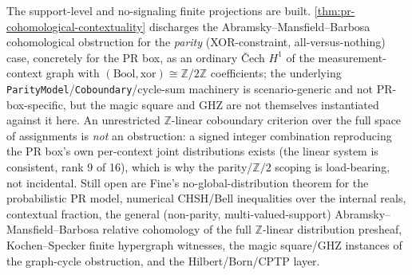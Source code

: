 \begin{theorem}\label{thm:quantum-contextuality-analytic-frontier}\notready{}
The support-level and no-signaling finite projections are built.
\ref{thm:pr-cohomological-contextuality} discharges the
Abramsky--Mansfield--Barbosa cohomological obstruction for the \emph{parity}
(XOR-constraint, all-versus-nothing) case, concretely for the PR box, as an
ordinary Čech \(H^1\) of the measurement-context graph with
\((\mathrm{Bool},\mathrm{xor}) \cong \mathbb{Z}/2\mathbb{Z}\) coefficients; the
underlying \texttt{ParityModel}/\texttt{Coboundary}/cycle-sum machinery is
scenario-generic and not PR-box-specific, but the magic square and GHZ are not
themselves instantiated against it here. An unrestricted \(\mathbb{Z}\)-linear
coboundary criterion over the full space of assignments is \emph{not} an
obstruction: a signed integer combination reproducing the PR box's own
per-context joint distributions exists (the linear system is consistent, rank
9 of 16), which is why the parity/\(\mathbb{Z}/2\) scoping is load-bearing,
not incidental. Still open are Fine's no-global-distribution theorem for the
probabilistic PR model, numerical CHSH/Bell inequalities over the internal
reals, contextual fraction, the general (non-parity, multi-valued-support)
Abramsky--Mansfield--Barbosa relative cohomology of the full
\(\mathbb{Z}\)-linear distribution presheaf, Kochen--Specker finite
hypergraph witnesses, the magic square/GHZ instances of the graph-cycle
obstruction, and the Hilbert/Born/CPTP layer.
\end{theorem}
